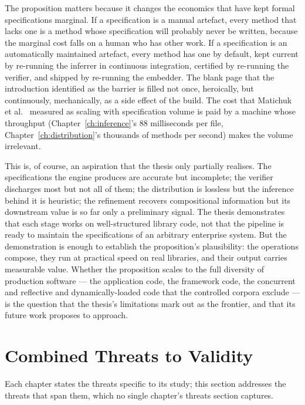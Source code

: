 The proposition matters because it changes the economics that have kept formal
specifications marginal. If a specification is a manual artefact, every method
that lacks one is a method whose specification will probably never be written,
because the marginal cost falls on a human who has other work. If a specification
is an automatically maintained artefact, every method has one by default, kept
current by re-running the inferrer in continuous integration, certified by
re-running the verifier, and shipped by re-running the embedder. The blank page
that the introduction identified as the barrier is filled not once, heroically,
but continuously, mechanically, as a side effect of the build. The cost that
Matichuk et al.~\cite{matichuk_cost_2015} measured as scaling with specification
volume is paid by a machine whose throughput (Chapter~\ref{ch:inference}'s 88
milliseconds per file, Chapter~\ref{ch:distribution}'s thousands of methods per
second) makes the volume irrelevant.

This is, of course, an aspiration that the thesis only partially realises. The
specifications the engine produces are accurate but incomplete; the verifier
discharges most but not all of them; the distribution is lossless but the
inference behind it is heuristic; the refinement recovers compositional
information but its downstream value is so far only a preliminary signal. The
thesis demonstrates that each stage works on well-structured library code, not
that the pipeline is ready to maintain the specifications of an arbitrary
enterprise system. But the demonstration is enough to establish the proposition's
plausibility: the operations compose, they run at practical speed on real
libraries, and their output carries measurable value. Whether the proposition
scales to the full diversity of production software --- the application code, the
framework code, the concurrent and reflective and dynamically-loaded code that
the controlled corpora exclude --- is the question that the thesis's limitations
mark out as the frontier, and that its future work proposes to approach.

\section{Combined Threats to Validity}
\label{sec:syn-threats}

Each chapter states the threats specific to its study; this section addresses the
threats that span them, which no single chapter's threats section captures.

